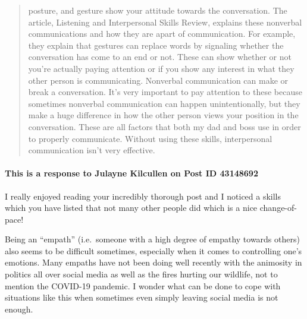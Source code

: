 \begin{quotation}
      posture, and gesture show your attitude towards the conversation. The
      article, Listening and Interpersonal Skills Review, explains these
      nonverbal communications and how they are apart of communication. For
      example, they explain that gestures can replace words by signaling whether
      the conversation has come to an end or not. These can show whether or not
      you're actually paying attention or if you show any interest in what they
      other person is communicating. Nonverbal communication can make or break a
      conversation. It's very important to pay attention to these because
      sometimes nonverbal communication can happen unintentionally, but they
      make a huge difference in how the other person views your position in the
      conversation. These are all factors that both my dad and boss use in order
      to properly communicate. Without using these skills, interpersonal
      communication isn't very effective.
  \end{quotation}

  \paragraph{This is a response to Julayne Kilcullen on Post ID 43148692}
    I really enjoyed reading your incredibly thorough post and I noticed a
      skills which you have listed that not many other people did which is a
      nice change-of-pace!

    Being an ``empath'' (i.e.\ someone with a high degree of empathy towards
      others) also seems to be difficult sometimes, especially when it comes
      to controlling one's emotions. Many empaths have not been doing well
      recently with the animosity in politics all over social media as well
      as the fires hurting our wildlife, not to mention the COVID-19 pandemic.
      I wonder what can be done to cope with situations like this when sometimes
      even simply leaving social media is not enough.
